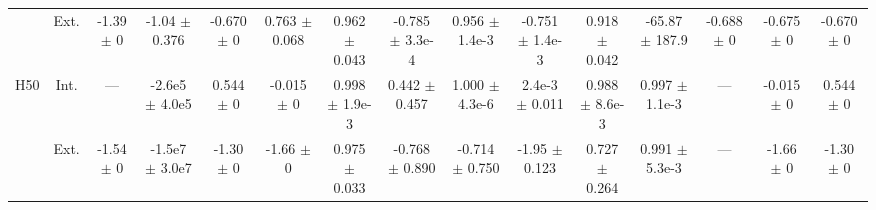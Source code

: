 \begin{table}[htbp]
{\begin{tabular}{@{}ccccccccccccccc@{}}
 & Ext. & -1.39 $\pm$ 0 & -1.04 $\pm$ 0.376 & -0.670 $\pm$ 0 & 0.763 $\pm$ 0.068 & 0.962 $\pm$ 0.043 & -0.785 $\pm$ 3.3e-4 & 0.956 $\pm$ 1.4e-3 & -0.751 $\pm$ 1.4e-3 & 0.918 $\pm$ 0.042 & -65.87 $\pm$ 187.9 & -0.688 $\pm$ 0 & -0.675 $\pm$ 0 & -0.670 $\pm$ 0 \\
\cline{2-15}
\multirow{2}{*}{H50} & Int. & --- & -2.6e5 $\pm$ 4.0e5 & 0.544 $\pm$ 0 & -0.015 $\pm$ 0 & 0.998 $\pm$ 1.9e-3 & 0.442 $\pm$ 0.457 & 1.000 $\pm$ 4.3e-6 & 2.4e-3 $\pm$ 0.011 & 0.988 $\pm$ 8.6e-3 & 0.997 $\pm$ 1.1e-3 & --- & -0.015 $\pm$ 0 & 0.544 $\pm$ 0 \\
 & Ext. & -1.54 $\pm$ 0 & -1.5e7 $\pm$ 3.0e7 & -1.30 $\pm$ 0 & -1.66 $\pm$ 0 & 0.975 $\pm$ 0.033 & -0.768 $\pm$ 0.890 & -0.714 $\pm$ 0.750 & -1.95 $\pm$ 0.123 & 0.727 $\pm$ 0.264 & 0.991 $\pm$ 5.3e-3 & --- & -1.66 $\pm$ 0 & -1.30 $\pm$ 0 \\
\bottomrule
\end{tabular}
}
\end{table}